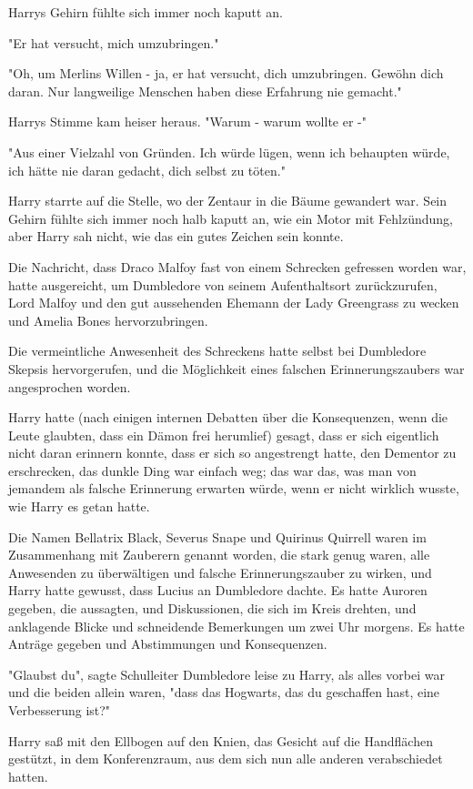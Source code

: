 {Harrys Gehirn fühlte sich immer noch kaputt an.

"Er hat versucht, mich umzubringen."

"Oh, um Merlins Willen - ja, er hat versucht, dich umzubringen. Gewöhn dich daran. Nur langweilige Menschen haben diese Erfahrung nie gemacht."

Harrys Stimme kam heiser heraus. "Warum - warum wollte er -"

"Aus einer Vielzahl von Gründen. Ich würde lügen, wenn ich behaupten würde, ich hätte nie daran gedacht, dich selbst zu töten."

Harry starrte auf die Stelle, wo der Zentaur in die Bäume gewandert war. Sein Gehirn fühlte sich immer noch halb kaputt an, wie ein Motor mit Fehlzündung, aber Harry sah nicht, wie das ein gutes Zeichen sein konnte.

Die Nachricht, dass Draco Malfoy fast von einem Schrecken gefressen worden war, hatte ausgereicht, um Dumbledore von seinem Aufenthaltsort zurückzurufen, Lord Malfoy und den gut aussehenden Ehemann der Lady Greengrass zu wecken und Amelia Bones hervorzubringen.

Die vermeintliche Anwesenheit des Schreckens hatte selbst bei Dumbledore Skepsis hervorgerufen, und die Möglichkeit eines falschen Erinnerungszaubers war angesprochen worden.

Harry hatte (nach einigen internen Debatten über die Konsequenzen, wenn die Leute glaubten, dass ein Dämon frei herumlief) gesagt, dass er sich eigentlich nicht daran erinnern konnte, dass er sich so angestrengt hatte, den Dementor zu erschrecken, das dunkle Ding war einfach weg; das war das, was man von jemandem als falsche Erinnerung erwarten würde, wenn er nicht wirklich wusste, wie Harry es getan hatte.

Die Namen Bellatrix Black, Severus Snape und Quirinus Quirrell waren im Zusammenhang mit Zauberern genannt worden, die stark genug waren, alle Anwesenden zu überwältigen und falsche Erinnerungszauber zu wirken, und Harry hatte gewusst, dass Lucius an Dumbledore dachte. Es hatte Auroren gegeben, die aussagten, und Diskussionen, die sich im Kreis drehten, und anklagende Blicke und schneidende Bemerkungen um zwei Uhr morgens. Es hatte Anträge gegeben und Abstimmungen und Konsequenzen.

"Glaubst du", sagte Schulleiter Dumbledore leise zu Harry, als alles vorbei war und die beiden allein waren, "dass das Hogwarts, das du geschaffen hast, eine Verbesserung ist?"

Harry saß mit den Ellbogen auf den Knien, das Gesicht auf die Handflächen gestützt, in dem Konferenzraum, aus dem sich nun alle anderen verabschiedet hatten.

}
